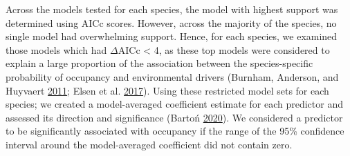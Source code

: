 \documentclass[
]{article}
\begin{document}
Across the models tested for each species, the model with highest support was determined using AICc scores. However, across the majority of the species, no single model had overwhelming support. Hence, for each species, we examined those models which had \(\Delta\)AICc \textless{} 4, as these top models were considered to explain a large proportion of the association between the species-specific probability of occupancy and environmental drivers (Burnham, Anderson, and Huyvaert \protect\hyperlink{ref-burnham2011}{2011}; Elsen et al. \protect\hyperlink{ref-elsen2017}{2017}). Using these restricted model sets for each species; we created a model-averaged coefficient estimate for each predictor and assessed its direction and significance (Bartoń \protect\hyperlink{ref-MuMIn}{2020}). We considered a predictor to be significantly associated with occupancy if the range of the 95\% confidence interval around the model-averaged coefficient did not contain zero.
\end{document}
